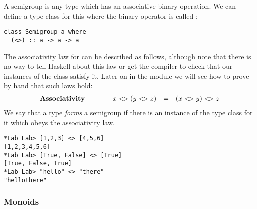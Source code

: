 A semigroup is any type which has an associative binary operation. We can define a type class for this where the binary operator is called \haskellIn{<>}:
\begin{verbatim}
class Semigroup a where 
  (<>) :: a -> a -> a 
\end{verbatim}
The associativity law for \haskellIn{<>} can be described as follows, although note that there is no way to tell Haskell about this law or get the compiler to check that our instances of the  class satisfy it. Later on in the module we will see how to prove by hand that such laws hold:
\begin{displaymath}
\begin{array}{lcrcl}
\textbf{Associativity} & \qquad & x <\!> (y <\!> z) & = & (x <\!> y) <\!> z 
\end{array}
\end{displaymath}
We say that a type \emph{forms} a semigroup if there is an instance of the  type class for it which obeys the associativity law.

\taskLine



\begin{verbatim}
*Lab Lab> [1,2,3] <> [4,5,6]      
[1,2,3,4,5,6]
*Lab Lab> [True, False] <> [True] 
[True, False, True]
*Lab Lab> "hello" <> "there" 
"hellothere"
\end{verbatim}

\taskLine 

\subsubsection{Monoids}

